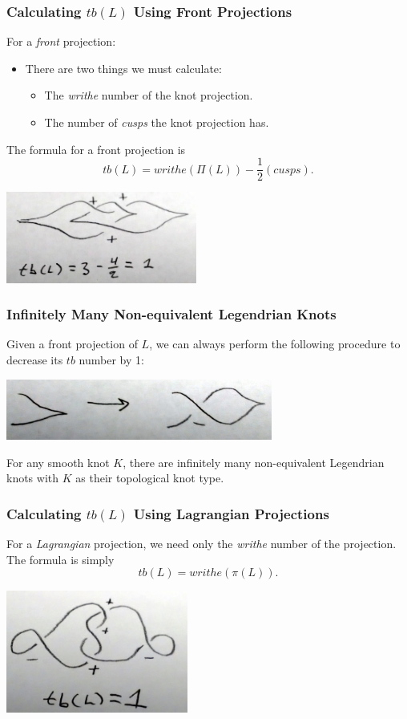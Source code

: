 \documentclass{beamer}
\begin{document}
\begin{frame}
    \frametitle{Calculating $tb(L)$ Using Front Projections}
    For a \textit{front} projection:
    \begin{itemize}
        \item There are two things we must calculate:
        \begin{itemize}
            \item The \textit{writhe} number of the knot projection.
            \item The number of \textit{cusps} the knot projection has.
        \end{itemize}
    \end{itemize}
    The formula for a front projection is
    \[tb(L) = writhe(\Pi(L)) - \frac{1}{2}(cusps).\]
    \begin{center}
    \includegraphics[height=3cm]{tbFront.jpg}
    \end{center}
\end{frame}

\begin{frame}
    \frametitle{Infinitely Many Non-equivalent Legendrian Knots}
    Given a front projection of $L$, we can always perform the following
    procedure to decrease its $tb$ number by 1:
    \begin{center}
    \includegraphics[height=2cm]{infKnots.jpg}
    \end{center}
    \begin{theorem}
    For any smooth knot $K$, there are infinitely many non-equivalent
    Legendrian knots with $K$ as their topological knot type.
    \end{theorem}
\end{frame}

\begin{frame}
    \frametitle{Calculating $tb(L)$ Using Lagrangian Projections}
    For a \textit{Lagrangian} projection, we need only the \textit{writhe}
    number of the projection. \\
    The formula is simply
    \[tb(L) = writhe(\pi(L)).\]
    \begin{center}
    \includegraphics[height=4cm]{tbLagr.jpg}
    \end{center}
\end{frame}
\end{document}
